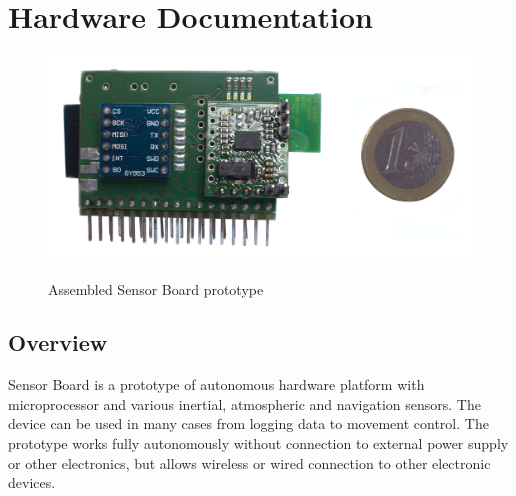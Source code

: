 \chapter{Hardware Documentation}
\label{hardwareDocumentation}

\begin{figure}[H]
	\centering
	\includegraphics[width=16cm]{img/HWassembled.jpg}
	\label{HWassembled}
	\caption{Assembled Sensor Board prototype}
\end{figure}

\section{Overview}
Sensor Board is a prototype of autonomous hardware platform with microprocessor and various inertial, atmospheric and navigation sensors. The device can be used in many cases from logging data to movement control. The prototype works fully autonomously without connection to external power supply or other electronics, but allows wireless or wired connection to other electronic devices.


